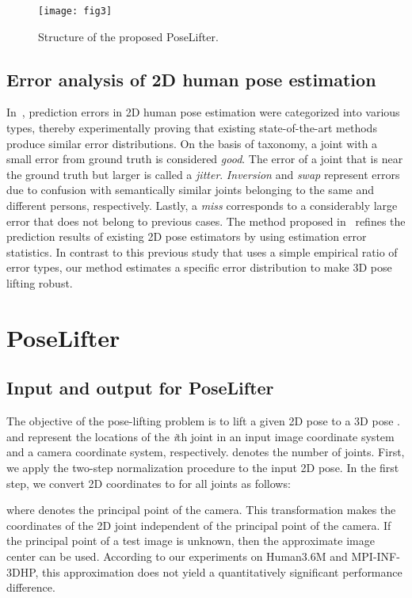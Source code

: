 \documentclass[10pt,twocolumn,letterpaper]{article}
\begin{document}
\begin{figure*}[t]
\centering
\texttt{[image: fig3]}
\caption{Structure of the proposed PoseLifter.}
\label{fig3}
\end{figure*}

\subsection{Error analysis of 2D human pose estimation}

In~\cite{Ronchi2017}, prediction errors in 2D human pose estimation were categorized into various types, thereby experimentally proving that existing state-of-the-art methods produce similar error distributions. On the basis of taxonomy, a joint with a small error from ground truth is considered \textit{good}. The error of a joint that is near the ground truth but larger is called a \textit{jitter}. \textit{Inversion} and \textit{swap} represent errors due to confusion with semantically similar joints belonging to the same and different persons, respectively. Lastly, a \textit{miss} corresponds to a considerably large error that does not belong to previous cases. The method proposed in~\cite{Moon2019} refines the prediction results of existing 2D pose estimators by using estimation error statistics. In contrast to this previous study that uses a simple empirical ratio of error types, our method estimates a specific error distribution to make 3D pose lifting robust.


\section{PoseLifter}
\label{sec3}

\subsection{Input and output for PoseLifter}
\label{sec3.1}

The objective of the pose-lifting problem is to lift a given 2D pose  to a 3D pose .  and  represent the locations of the \textit{i}th joint in an input image coordinate system and a camera coordinate system, respectively.  denotes the number of joints. First, we apply the two-step normalization procedure to the input 2D pose. In the first step, we convert 2D coordinates  to  for all joints  as follows:

where  denotes the principal point of the camera. This transformation makes the coordinates of the 2D joint independent of the principal point of the camera. If the principal point of a test image is unknown, then the approximate image center can be used. According to our experiments on Human3.6M and MPI-INF-3DHP, this approximation does not yield a quantitatively significant performance difference.
\end{document}
